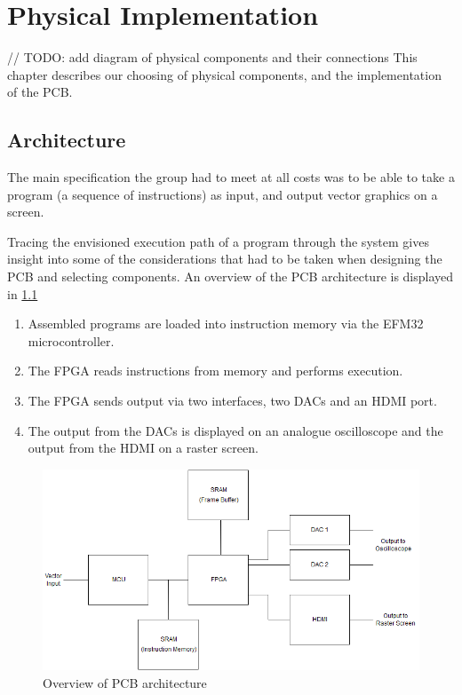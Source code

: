 \chapter{Physical Implementation}

// TODO: add diagram of physical components and their connections
This chapter describes our choosing of physical components, and the implementation of the PCB.

\section{Architecture}
The main specification the group had to meet at all costs was to be able to take a program (a sequence of instructions) as input, and output vector graphics on a screen.

Tracing the envisioned execution path of a program through the system gives insight into some of the considerations that had to be taken when designing the PCB and selecting components. An overview of the PCB architecture is displayed in \ref{fig:PCB_Overview}

\begin{enumerate}
\item Assembled \vthreek programs are loaded into instruction memory via the EFM32 microcontroller.
\item The FPGA reads instructions from memory and performs execution.
\item The FPGA sends output via two interfaces, two DACs and an HDMI port.
\item The output from the DACs is displayed on an analogue oscilloscope and the output from the HDMI on a raster screen.
\end{enumerate}

\begin{figure}[h!]
\centering
\includegraphics[scale = 0.4]{images/PCB_Overview.png}
\caption{Overview of PCB architecture}
\label{fig:PCB_Overview}
\end{figure}

